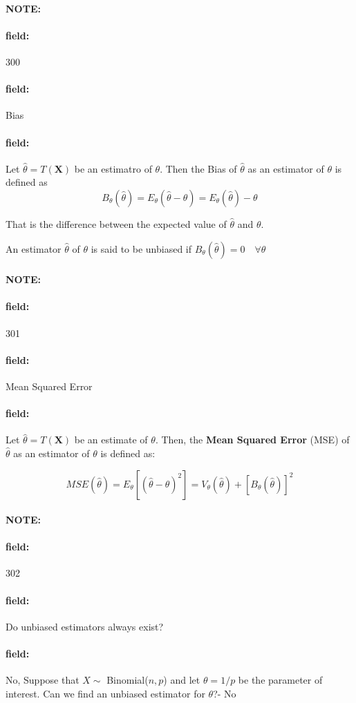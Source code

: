 \documentclass[12pt]{article}
\newenvironment{note}{\paragraph{NOTE:}}{}
\newenvironment{field}{\paragraph{field:}}{}
\begin{document}
\begin{note} \begin{field} \tiny 300 \end{field}
  \begin{field}
    Bias
  \end{field}
  \begin{field}
    Let $\hat{\theta} = T(\mathbf{X})$ be an estimatro of $\theta$. Then the Bias of $\hat{\theta}$ as an estimator of $\theta$ is defined as
    $$B_{\theta}(\hat{\theta}) = E_\theta(\hat{\theta} - \theta) = E_\theta(\hat{\theta}) - \theta$$

    That is the difference between the expected value of $\hat{\theta}$ and $\theta$.

    An estimator $\hat{\theta}$ of $\theta$ is said to be unbiased if $B_\theta(\hat{\theta}) = 0 \quad \forall \theta$
  \end{field}
\end{note}

\begin{note} \begin{field} \tiny 301 \end{field}
  \begin{field}
    Mean Squared Error
  \end{field}
  \begin{field}
    Let $\hat{\theta} = T(\mathbf{X})$ be an estimate of $\theta$. Then, the \textbf{Mean Squared Error} (MSE) of $\hat{\theta}$ as an estimator of $\theta$ is defined as:

    $$ MSE (\hat{\theta}) = E_{\theta}[(\hat{\theta} - \theta)^2] = V_\theta(\hat{\theta}) + [B_\theta(\hat{\theta})]^2$$

  \end{field}
\end{note}

\begin{note} \begin{field} \tiny 302 \end{field}
  \begin{field}
    Do unbiased estimators always exist?
  \end{field}
  \begin{field}
    No, Suppose that $X \sim $ Binomial($n,p$) and let $\theta = 1/p$ be the parameter of interest. Can we find an unbiased estimator for $\theta$?- No
  \end{field}
\end{note}
\end{document}
